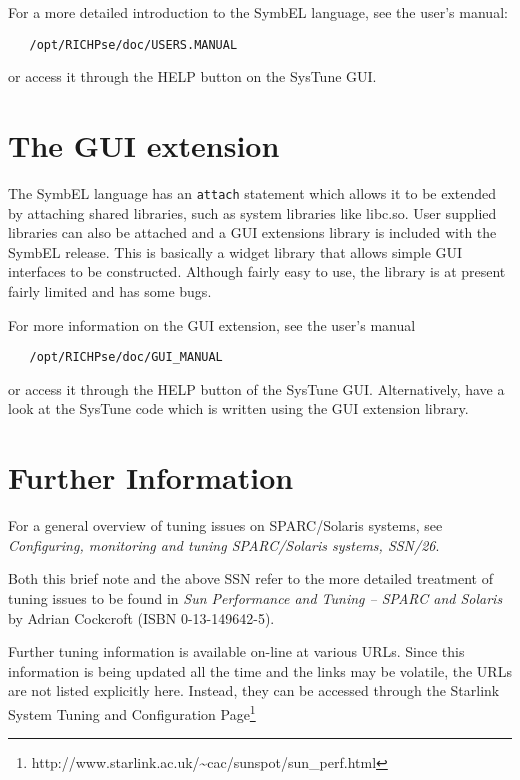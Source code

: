 \documentclass[11pt]{article}
\newcommand{\htmladdnormallinkfoot}[2]{#1\footnote{#2}}
\newcommand{\xref}[3]{#1}
\newcommand{\xlabel}[1]{}
\begin{document}
For a more detailed introduction to the SymbEL language, see the user's
manual:

\begin{verbatim}
   /opt/RICHPse/doc/USERS.MANUAL
\end{verbatim}

or access it through the HELP button on the SysTune GUI.

\section{\label{gui}\xlabel{gui}The GUI extension}

The SymbEL language has an {\tt{attach}} statement which allows it to be
extended by attaching shared libraries, such as system libraries like
libc.so. User supplied libraries can also be attached and a GUI extensions
library is included with the SymbEL release. This is basically a widget
library that allows simple GUI interfaces to be constructed. Although
fairly easy to use, the library is at present fairly limited and has some
bugs.

For more information on the GUI extension, see the user's manual

\begin{verbatim}
   /opt/RICHPse/doc/GUI_MANUAL
\end{verbatim}

or access it through the HELP button of the SysTune GUI. Alternatively,
have a look at the SysTune code which is written using the GUI extension
library.

\section{\label{more_info}\xlabel{more_info}Further Information}

For a general overview of tuning issues on SPARC/Solaris systems, see
\xref{{\em{Configuring, monitoring and tuning SPARC/Solaris
systems}, SSN/26}}{ssn26}{}.

Both this brief note and the above SSN refer to the more detailed treatment
of tuning issues to be found in {\em{Sun Performance and Tuning -- SPARC and
Solaris}} by Adrian Cockcroft (ISBN 0-13-149642-5).

Further tuning information is available on-line at various URLs. Since
this information is being updated all the time and the links may be
volatile, the URLs are not listed explicitly here. Instead, they can be
accessed through \htmladdnormallinkfoot{the Starlink System Tuning and
Configuration Page}{http://www.starlink.ac.uk/\~{}cac/sunspot/sun\_perf.html}
\end{document}
